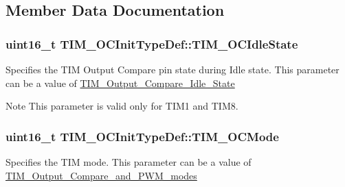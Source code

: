 \subsection{Member Data Documentation}
\subsubsection[{\texorpdfstring{T\+I\+M\+\_\+\+O\+C\+Idle\+State}{TIM_OCIdleState}}]{\setlength{\rightskip}{0pt plus 5cm}uint16\+\_\+t T\+I\+M\+\_\+\+O\+C\+Init\+Type\+Def\+::\+T\+I\+M\+\_\+\+O\+C\+Idle\+State}\hypertarget{struct_t_i_m___o_c_init_type_def_a2a28f2d62339e06caef12816e04a8f55}{}\label{struct_t_i_m___o_c_init_type_def_a2a28f2d62339e06caef12816e04a8f55}
Specifies the T\+IM Output Compare pin state during Idle state. This parameter can be a value of \hyperlink{group___t_i_m___output___compare___idle___state}{T\+I\+M\+\_\+\+Output\+\_\+\+Compare\+\_\+\+Idle\+\_\+\+State} \begin{DoxyNote}{Note}
This parameter is valid only for T\+I\+M1 and T\+I\+M8. 
\end{DoxyNote}
\subsubsection[{\texorpdfstring{T\+I\+M\+\_\+\+O\+C\+Mode}{TIM_OCMode}}]{\setlength{\rightskip}{0pt plus 5cm}uint16\+\_\+t T\+I\+M\+\_\+\+O\+C\+Init\+Type\+Def\+::\+T\+I\+M\+\_\+\+O\+C\+Mode}\hypertarget{struct_t_i_m___o_c_init_type_def_ad4338ed2415b0d6d19589bf72b7ba3b0}{}\label{struct_t_i_m___o_c_init_type_def_ad4338ed2415b0d6d19589bf72b7ba3b0}
Specifies the T\+IM mode. This parameter can be a value of \hyperlink{group___t_i_m___output___compare__and___p_w_m__modes}{T\+I\+M\+\_\+\+Output\+\_\+\+Compare\+\_\+and\+\_\+\+P\+W\+M\+\_\+modes} 
